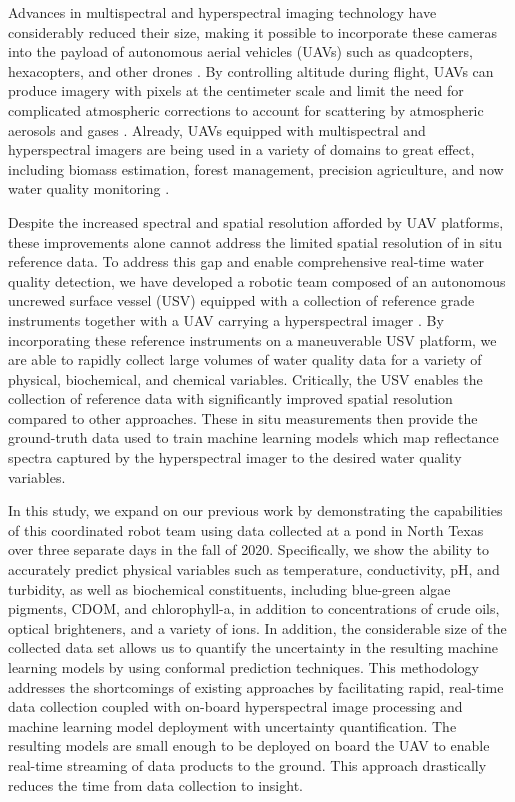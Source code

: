 \documentclass[remotesensing,article,submit,pdftex,moreauthors]{Definitions/mdpi}
\begin{document}
Advances in multispectral and hyperspectral imaging technology have considerably reduced their size, making it possible to incorporate these cameras into the payload of autonomous aerial vehicles (UAVs) such as quadcopters, hexacopters, and other drones \cite{hruska2012radiometric}. By controlling altitude during flight, UAVs can produce imagery with pixels at the centimeter scale and limit the need for complicated atmospheric corrections to account for scattering by atmospheric aerosols and gases \cite{adao2017hyperspectral,banerjee2020uav}. Already, UAVs equipped with multispectral and hyperspectral imagers are being used in a variety of domains to great effect, including biomass estimation, forest management, precision agriculture, and now water quality monitoring \cite{adao2017hyperspectral, padua2017uas,arroyo2019implementation,kurihara2020unmanned,ehmann2019monitoring, lu2021retrieval}.  

Despite the increased spectral and spatial resolution afforded by UAV platforms, these improvements alone cannot address the limited spatial resolution of in situ reference data.  To address this gap and enable comprehensive real-time water quality detection, we have developed a robotic team composed of an autonomous uncrewed surface vessel (USV) equipped with a collection of reference grade instruments together with a UAV carrying a hyperspectral imager \cite{robotTeam1}. By incorporating these reference instruments on a maneuverable USV platform, we are able to rapidly collect large volumes of water quality data for a variety of physical, biochemical, and chemical variables. Critically, the USV enables the collection of reference data with significantly improved spatial resolution compared to other approaches. These in situ measurements then provide the ground-truth data used to train machine learning models which map reflectance spectra captured by the hyperspectral imager to the desired water quality variables.

In this study, we expand on our previous work by demonstrating the capabilities of this coordinated robot team using data collected at a pond in North Texas over three separate days in the fall of 2020. Specifically, we show the ability to accurately predict physical variables such as temperature, conductivity, pH, and turbidity, as well as biochemical constituents, including blue-green algae pigments, CDOM, and chlorophyll-a, in addition to concentrations of crude oils, optical brighteners, and a variety of ions. In addition, the considerable size of the collected data set allows us to quantify the uncertainty in the resulting machine learning models by using conformal prediction techniques. This methodology addresses the shortcomings of existing approaches by facilitating rapid, real-time data collection coupled with on-board hyperspectral image processing and machine learning model deployment with uncertainty quantification. The resulting models are small enough to be deployed on board the UAV to enable real-time streaming of data products to the ground. This approach drastically reduces the time from data collection to insight.
\end{document}
